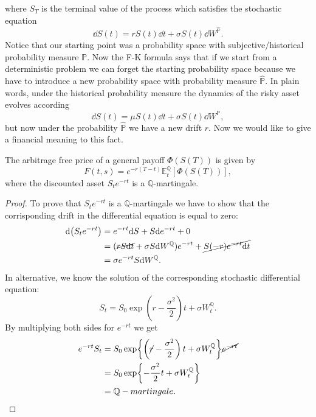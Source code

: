 where $S_T$ is the terminal value of the process which satisfies the stochastic equation
\begin{equation}
    \dd S(t) = rS(t)\dd t + \sigma S(t)\dd W^{\hat{\mathbb{P}}}.
\end{equation}
Notice that our starting point was a probability space with subjective/historical probability measure $\mathbb{P}$. Now the F-K formula says that if we start from a deterministic problem we can forget the starting probability space because we have to introduce a new probability space with probability measure $\hat{\mathbb{P}}$. In plain words, under the historical probability measure the dynamics of the risky asset evolves according
\begin{equation}
    \dd S(t) =  \mu S(t)\dd t + \sigma S(t)\dd W^{\mathbb{P}},
\end{equation}
but now under the probability $\hat{\mathbb{P}}$ we have a new drift $r$. Now we would like to give a financial meaning to this fact.
\begin{proposition}
    The arbitrage free price of a general payoff $\Phi(S(T))$ is given by
    \begin{equation}\label{rnv}
        F(t,s) = e^{-r(T-t)}\mathbb{E}^{\mathbb{Q}}_t [\Phi(S(T))],
    \end{equation}
    where the discounted asset $S_te^{-rt}$ is a $\mathbb{Q}$-martingale.
\end{proposition}
\begin{proof}
    To prove that $S_te^{-rt}$ is a $\mathbb{Q}$-martingale we have to show that the corrisponding drift in the differential equation is equal to zero:
    \begin{align*}
        \dd(S_te^{-rt}) &= e^{-rt}\dd S + S\dd e^{-rt} + 0 \\
        &=
        (\cancel{rS\dd t} + \sigma S\dd W^{\mathbb{Q}})e^{-rt} + \cancel{S(-r)e^{-rt}\dd t} \\
        &=
        \sigma e^{-rt} S\dd W^{\mathbb{Q}}.
    \end{align*}
    In alternative, we know the solution of the corresponding stochastic differential equation:
    \begin{equation*}
        S_t = S_0\exp{\left(r-\frac{\sigma^2}{2}\right)t + \sigma W_t^\mathbb{Q}}.
    \end{equation*}
    By multiplying both sides for $e^{-rt}$ we get
    \begin{align*}
        e^{-rt}S_t &= S_0\exp{\left(\cancel{r}-\frac{\sigma^2}{2}\right)t + \sigma W_t^\mathbb{Q}}\cancel{e^{-rt}} \\
        &=
        S_0\exp{-\frac{\sigma^2}{2}t + \sigma W_t^\mathbb{Q}} \\
        &=
        \mathbb{Q}-martingale.
    \end{align*}
\end{proof}
